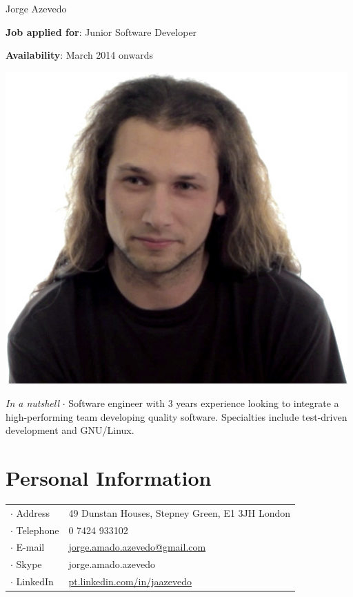 



\topSection
{
	{\Huge Jorge Azevedo}

	\vspace{1.5mm}
	\vspace*{10mm}

	\textbf{Job applied for}: Junior Software Developer

	\textbf{Availability}: March 2014 onwards
} {
	\includegraphics[width=0.985\textwidth]{img/photo}
}

\emph{In a nutshell} $\cdot$ Software engineer with 3 years experience looking
to integrate a high-performing team developing quality software. Specialties
include test-driven development and GNU/Linux.

\section*{Personal Information}

{
\begin{tabular}[t]{@{}l l}
	$\cdot$  Address & 49 Dunstan Houses, Stepney Green, E1 3JH London \\
	$\cdot$  Telephone & 0 7424 933102 \\
	$\cdot$  E-mail & \href{mailto:jorge.amado.azevedo@gmail.com}{jorge.amado.azevedo@gmail.com} \\
	$\cdot$  Skype & jorge.amado.azevedo\\
	$\cdot$  LinkedIn & \href{http://pt.linkedin.com/in/jaazevedo}{pt.linkedin.com/in/jaazevedo}\\
\end{tabular}
}

